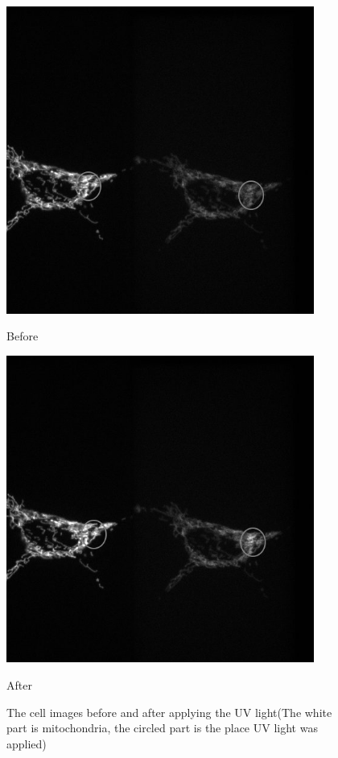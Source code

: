 \documentclass[a4paper,english,12pt,bibliography=totoc]{scrreprt}
\begin{document}
\begin{figure}[htbp]
    \begin{minipage}[t]{0.5\linewidth}
        \centering
        \includegraphics[width=0.9\textwidth]{Images/Green_to_red/5.jpg}
        \caption{Before}
    \end{minipage}%
    \begin{minipage}[t]{0.5\linewidth}
        \centering
        \includegraphics[width=0.9\textwidth]{Images/Green_to_red/20.jpg}
        \caption{After}
    \end{minipage}
    \caption{The cell images before and after applying the UV light(The white part is mitochondria, the circled part is the place UV light was applied)}
\end{figure}
\end{document}
